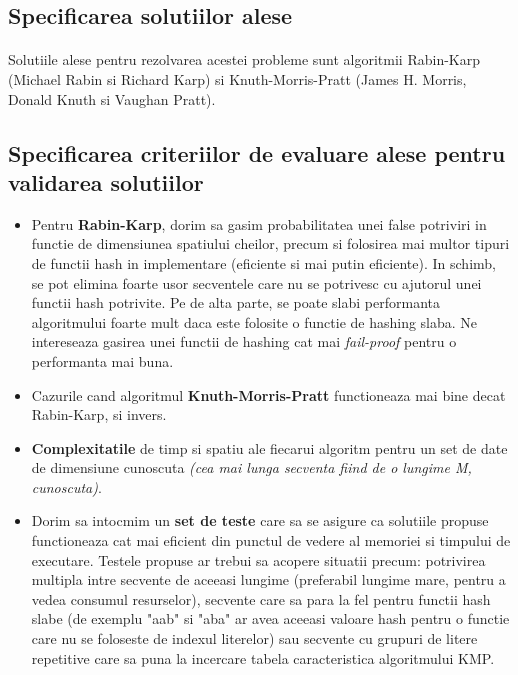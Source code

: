 \documentclass[runningheads]{llncs}
\begin{document}
\subsection{Specificarea solutiilor alese}
\paragraph{} Solutiile alese pentru rezolvarea acestei probleme sunt algoritmii Rabin-Karp (Michael Rabin si Richard Karp) si Knuth-Morris-Pratt (James H. Morris, Donald Knuth si Vaughan Pratt).

\subsection{Specificarea criteriilor de evaluare alese pentru validarea solutiilor}
\begin{itemize}
		\item Pentru \textbf{Rabin-Karp}, dorim sa gasim probabilitatea unei false potriviri in functie de dimensiunea spatiului cheilor, precum si folosirea mai multor tipuri de functii hash in implementare (eficiente si mai putin eficiente). In schimb, se pot elimina foarte usor secventele care nu se potrivesc cu ajutorul unei functii hash potrivite. Pe de alta parte, se poate slabi performanta algoritmului foarte mult daca este folosite o functie de hashing slaba. Ne intereseaza gasirea unei functii de hashing cat mai \textit{fail-proof} pentru o performanta mai buna.
	\item Cazurile cand algoritmul \textbf{Knuth-Morris-Pratt} functioneaza mai bine decat Rabin-Karp, si invers.
	\item \textbf{Complexitatile} de timp si spatiu ale fiecarui algoritm pentru un set de date de dimensiune cunoscuta \textit{(cea mai lunga secventa fiind de o lungime M, cunoscuta)}.
	\item Dorim sa intocmim un \textbf{set de teste} care sa se asigure ca solutiile propuse functioneaza cat mai eficient din punctul de vedere al memoriei si timpului de executare. Testele propuse ar trebui sa acopere situatii precum: potrivirea multipla intre secvente de aceeasi lungime (preferabil lungime mare, pentru a vedea consumul resurselor), secvente care sa para la fel pentru functii hash slabe (de exemplu "aab" si "aba" ar avea aceeasi valoare hash pentru o functie care nu se foloseste de indexul literelor) sau secvente cu grupuri de litere repetitive care sa puna la incercare tabela caracteristica algoritmului KMP.
\end{itemize}
\end{document}
